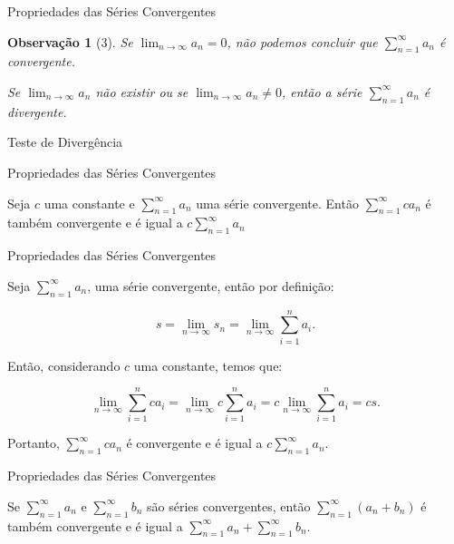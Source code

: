 \documentclass[brazil]{beamer}
\newtheorem{observation}{Observação}\theoremstyle{definition}
\begin{document}
	\begin{frame}{Propriedades das Séries Convergentes}
		
		\begin{observation}[3]
			\justifying
			Se $\displaystyle\lim_{n \to \infty} a_n = 0$, não podemos concluir que $\displaystyle\sum_{n=1}^{\infty}a_n$ é convergente.
			
			Se $\displaystyle\lim_{n \to \infty} a_n$ não existir ou se
			$\displaystyle\lim_{n \to \infty} a_n \neq 0$, então a série
			$\displaystyle\sum_{n=1}^{\infty}a_n$ é divergente.
		\end{observation}
		
		\small{Teste de Divergência}
	\end{frame}
	\begin{frame}{Propriedades das Séries Convergentes}
		\begin{theorem}[2]
			
			Seja $c$ uma constante e $\displaystyle\sum_{n=1}^{\infty} a_n$ uma série
			convergente. Então $\displaystyle\sum_{n=1}^{\infty} ca_n$ é também convergente
			e é igual a $c \displaystyle\sum_{n=1}^{\infty} a_n$
			
		\end{theorem}
	\end{frame}
	\begin{frame}{Propriedades das Séries Convergentes}
		
		Seja $\displaystyle\sum_{n=1}^{\infty} a_n$, uma série convergente, então por
		definição:
		
		$$s = \lim_{n \to \infty}s_n = \lim_{n \to \infty} \sum_{i=1}^{n} a_i.$$
		
		Então, considerando $c$ uma constante, temos que:
		
		$$\lim_{n \to \infty} \sum_{i=1}^{n} ca_i = \lim_{n \to \infty} c \sum_{i=1}^{n} a_i = c \lim_{n \to \infty} \sum_{i=1}^{n} a_i= cs.$$
		
		Portanto, $\displaystyle\sum_{n=1}^{\infty} ca_n$ é convergente e é igual a $c
		\displaystyle\sum_{n=1}^{\infty} a_n$.
		
	\end{frame}
	\begin{frame}{Propriedades das Séries Convergentes}
		\begin{theorem}[3]
			
			Se $\displaystyle\sum_{n=1}^{\infty} a_n$ e $\displaystyle\sum_{n=1}^{\infty}
			b_n$ são séries convergentes, então $\displaystyle\sum_{n=1}^{\infty} (a_n +
			b_n)$ é também convergente e é igual a $\displaystyle\sum_{n=1}^{\infty} a_n +
			\sum_{n=1}^{\infty} b_n$.
			
		\end{theorem}
	\end{frame}
\end{document}
